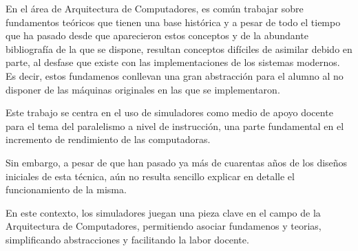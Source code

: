 En el área de Arquitectura de Computadores, es común trabajar sobre fundamentos teóricos
que tienen una base histórica y a pesar de todo el tiempo que ha pasado desde 
que aparecieron estos conceptos y de la abundante bibliografía de la que se
dispone, resultan conceptos difíciles de asimilar debido en parte, al desfase que existe
con las implementaciones de los sistemas modernos. Es decir, estos 
fundamenos conllevan una gran abstracción para el alumno al no disponer de las máquinas originales
en las que se implementaron.

\bigskip
Este trabajo se centra en el uso de simuladores como medio de apoyo docente para el 
tema del  paralelismo a nivel de instrucción, una parte fundamental en el incremento
de rendimiento de las computadoras.

\bigskip
Sin embargo, a pesar de que han pasado ya más de cuarentas años de los diseños iniciales de esta 
técnica, aún no resulta sencillo explicar en detalle el funcionamiento de la misma.

\bigskip
En este contexto, los simuladores juegan una pieza clave en el campo de la Arquitectura de Computadores,
permitiendo asociar fundamenos y teorias, simplificando abstracciones y facilitando la labor docente.